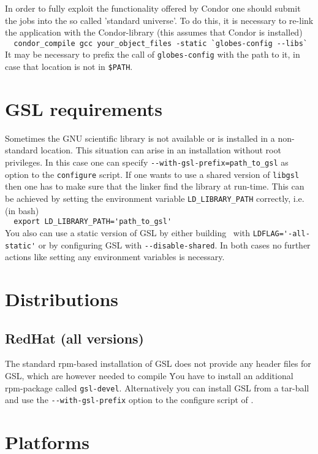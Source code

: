 \begin{appendix}
In order to fully exploit the functionality offered by Condor one
should submit the jobs into the so called 'standard universe'. To do
this, it is necessary to re-link the application with the
Condor-library (this assumes that Condor is installed)\\ 
\verb+  condor_compile gcc your_object_files -static `globes-config --libs`+\\
It may be necessary to prefix the call of \verb+globes-config+ with
the path to it, in case that location is not in \verb+$PATH+.

\section*{GSL requirements}

Sometimes the GNU scientific library is not available or is installed
in a non-standard location. This situation can arise in an
installation without root privileges. In this case one can specify
\verb+--with-gsl-prefix=path_to_gsl+ as option to the \verb+configure+ script.
If one wants to use a shared version of \verb+libgsl+ then one has to make
sure that the linker find the library at run-time. This can be
achieved by setting the environment variable \verb+LD_LIBRARY_PATH+
correctly, i.e. (in bash)\\
\verb+  export LD_LIBRARY_PATH='path_to_gsl'+\\
You also can use a static version of GSL by either building \GLOBES\
with \verb+LDFLAG='-all-static'+ or by configuring GSL with
\verb+--disable-shared+. In both cases no further actions like setting any
environment variables is necessary.

\section*{Distributions}


\subsection*{RedHat (all versions)}

The standard rpm-based installation of GSL does not provide any header
files for GSL, which are however needed to compile \GLOBES\. You have to
install an additional rpm-package called \verb+gsl-devel+. Alternatively
you can install GSL from a tar-ball and use the \verb+--with-gsl-prefix+
option to the configure script of \GLOBES.

\section*{Platforms}



\end{appendix}
